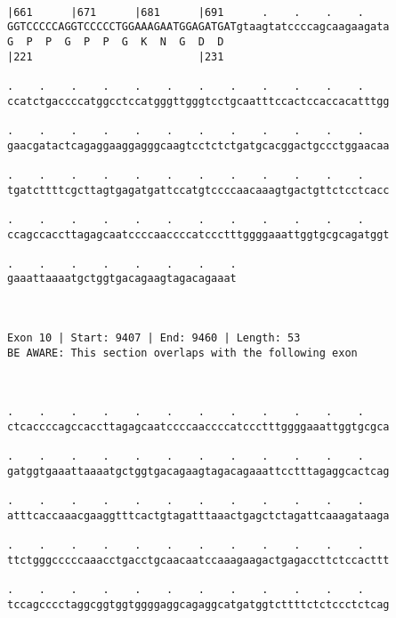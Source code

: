 \documentclass{article}
\begin{document}
\begin{Verbatim}
  
|661      |671      |681      |691      .    .    .    .    
GGTCCCCCAGGTCCCCCTGGAAAGAATGGAGATGATgtaagtatccccagcaagaagata
G  P  P  G  P  P  G  K  N  G  D  D                          
|221                          |231                          
  
.    .    .    .    .    .    .    .    .    .    .    .    
ccatctgaccccatggcctccatgggttgggtcctgcaatttccactccaccacatttgg
                                                            
.    .    .    .    .    .    .    .    .    .    .    .    
gaacgatactcagaggaaggagggcaagtcctctctgatgcacggactgccctggaacaa
                                                            
.    .    .    .    .    .    .    .    .    .    .    .    
tgatcttttcgcttagtgagatgattccatgtccccaacaaagtgactgttctcctcacc
                                                            
.    .    .    .    .    .    .    .    .    .    .    .    
ccagccaccttagagcaatccccaaccccatccctttggggaaattggtgcgcagatggt
                                                            
.    .    .    .    .    .    .    .
gaaattaaaatgctggtgacagaagtagacagaaat
                                    
                                    
 
Exon 10 | Start: 9407 | End: 9460 | Length: 53
BE AWARE: This section overlaps with the following exon



.    .    .    .    .    .    .    .    .    .    .    .    
ctcaccccagccaccttagagcaatccccaaccccatccctttggggaaattggtgcgca
                                                            
.    .    .    .    .    .    .    .    .    .    .    .    
gatggtgaaattaaaatgctggtgacagaagtagacagaaattcctttagaggcactcag
                                                            
.    .    .    .    .    .    .    .    .    .    .    .    
atttcaccaaacgaaggtttcactgtagatttaaactgagctctagattcaaagataaga
                                                            
.    .    .    .    .    .    .    .    .    .    .    .    
ttctgggcccccaaacctgacctgcaacaatccaaagaagactgagaccttctccacttt
                                                            
.    .    .    .    .    .    .    .    .    .    .    .    
tccagcccctaggcggtggtggggaggcagaggcatgatggtcttttctctccctctcag
                                                            

\end{Verbatim}
\end{document}
